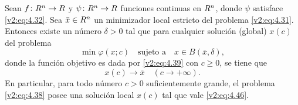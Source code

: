 \begin{theorem}\label{v2:thm:4.3.2}
    Sean $f \colon R^n \to R$ y $\psi \colon R^n \to R$ funciones continuas en $R^n$, donde $\psi$ satisface \eqref{v2:eq:4.32}. Sea $\bar{x} \in R^n$ un minimizador local estricto del problema \eqref{v2:eq:4.31}.
    Entonces existe un número $\delta > 0$ tal que para cualquier solución (global) $x(c)$ del problema
    \[
        \min \varphi(x; c) \quad \text{sujeto a} \quad x \in B(\bar{x}, \delta),
    \]
    donde la función objetivo es dada por \eqref{v2:eq:4.39} con $c \ge 0$, se tiene que
    \begin{equation}
        x(c) \to \bar{x} \quad (c \to +\infty).
        \label{v2:eq:4.46}
    \end{equation}
    En particular, para todo número $c > 0$ suficientemente grande, el problema \eqref{v2:eq:4.38} posee una solución local $x(c)$ tal que vale \eqref{v2:eq:4.46}.
\end{theorem}
